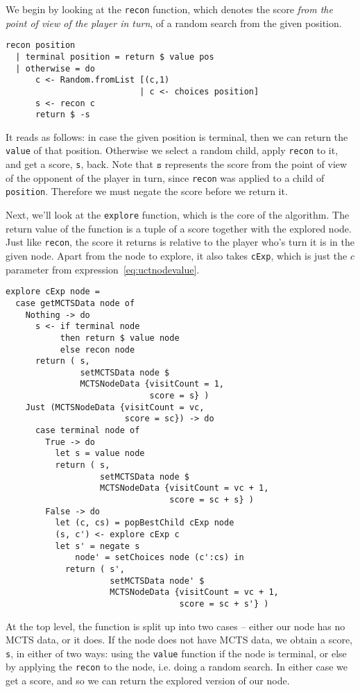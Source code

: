 We begin by looking at the \texttt{recon} function, which denotes the score \emph{from the point of view of the player in turn}, of a random search from the given position.
\begin{minipage}{\linewidth}
\begin{lstlisting}[frame=single]
recon position
  | terminal position = return $ value pos
  | otherwise = do
      c <- Random.fromList [(c,1)
                           | c <- choices position]
      s <- recon c
      return $ -s
\end{lstlisting}
\end{minipage}
It reads as follows: in case the given position is terminal, then we can return the \texttt{value} of that position. Otherwise we select a random child, apply \texttt{recon} to it, and get a score, \texttt{s}, back.
Note that $\texttt{s}$ represents the score from the point of view of the opponent of the player in turn, since \texttt{recon} was applied to a child of \texttt{position}. Therefore we must negate the score before we return it.

Next, we'll look at the \texttt{explore} function, which is the core of the algorithm. The return value of the function is a tuple of a score together with the explored node. Just like \texttt{recon}, the score it returns is relative to the player who's turn it is in the given node. Apart from the node to explore, it also takes \texttt{cExp}, which is just the $c$ parameter from expression~\ref{eq:uctnodevalue}.

\begin{minipage}{\linewidth}
\begin{lstlisting}[frame=single]
explore cExp node = 
  case getMCTSData node of
    Nothing -> do
      s <- if terminal node
           then return $ value node
           else recon node
      return ( s,
               setMCTSData node $
               MCTSNodeData {visitCount = 1,
                             score = s} )
    Just (MCTSNodeData {visitCount = vc,
                        score = sc}) -> do
      case terminal node of
        True -> do
          let s = value node
          return ( s,
                   setMCTSData node $
                   MCTSNodeData {visitCount = vc + 1,
                                 score = sc + s} )
        False -> do
          let (c, cs) = popBestChild cExp node
          (s, c') <- explore cExp c
          let s' = negate s
              node' = setChoices node (c':cs) in
            return ( s',
                     setMCTSData node' $
                     MCTSNodeData {visitCount = vc + 1,
                                   score = sc + s'} )
\end{lstlisting}
\end{minipage}
At the top level, the function is split up into two cases -- either our node has no MCTS data, or it does.
If the node does not have MCTS data, we obtain a score, \texttt{s}, in either of two ways: using the \texttt{value} function if the node is terminal, or else by applying the \texttt{recon} to the node, i.e. doing a random search.
In either case we get a score, and so we can return the explored version of our node.

